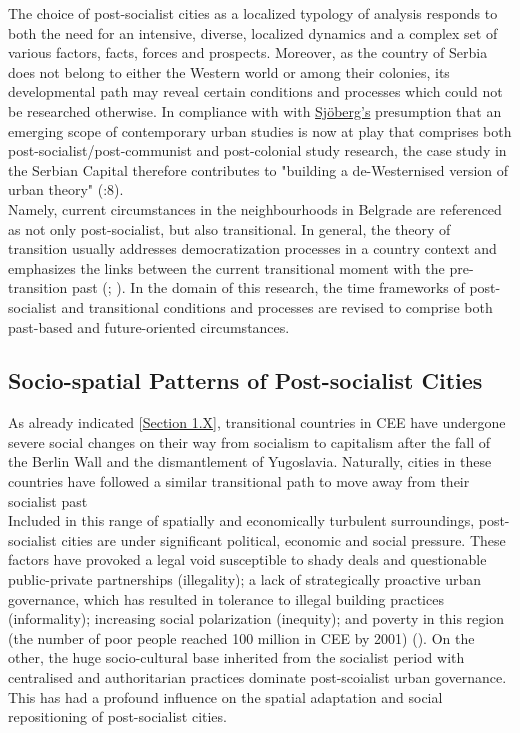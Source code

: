 \documentclass[11pt]{report}
\begin{document}
{{{{The choice of post-socialist cities as a localized typology of analysis responds to both the need for an intensive, diverse, localized dynamics and a complex set of various factors, facts, forces and prospects. Moreover, as the country of Serbia does not belong to either the Western world or among their colonies, its developmental path may reveal certain conditions and processes which could not be researched otherwise.
In compliance with with \href{Sjoberg}{Sjöberg's} presumption that an emerging scope of contemporary urban studies is now at play that comprises both post-socialist/post-communist and post-colonial study research, the case study in the Serbian Capital therefore contributes to "building a de-Westernised version of urban theory" (\href{Sjöberg}{\citealt{sjoberg_cases_2014}}:8).
\\

Namely, current circumstances in the neighbourhoods in Belgrade are referenced as not only post-socialist, but also transitional.
In general, the theory of transition usually addresses democratization processes in a country context and emphasizes the links between the current transitional moment with the pre-transition past (\href{Thomas}{\citealt{thomas_thinking_1998}}; \href{Holmes}{\citealt{dryzek_post-communist_2002}}).
In the domain of this research, the time frameworks of post-socialist and transitional conditions and processes are revised to comprise both past-based and future-oriented circumstances.

\subsection{Socio-spatial Patterns of Post-socialist Cities}

As already indicated [\href{(ref introduction section)}{Section 1.X}], transitional countries in CEE have undergone severe social changes on their way from socialism to capitalism after the fall of the Berlin Wall and the dismantlement of Yugoslavia.
Naturally, cities in these countries have followed a similar transitional path to move away from their socialist past
\\

Included in this range of spatially and economically turbulent surroundings, post-socialist cities are under significant political, economic and social pressure.
These factors have provoked a legal void susceptible to shady deals and questionable public-private partnerships (illegality); a lack of strategically proactive urban governance, which has resulted in tolerance to illegal building practices (informality); increasing social polarization (inequity); and poverty in this region (the number of poor people reached 100 million in CEE by 2001)  (\href{ref}{\citealt{tsenkova_beyond_2006}}).
On the other, the huge socio-cultural base inherited from the socialist period with centralised and authoritarian practices dominate post-scoialist urban governance. This has had a profound influence on the spatial adaptation and social repositioning of post-socialist cities.
\\

}}}}
\end{document}
